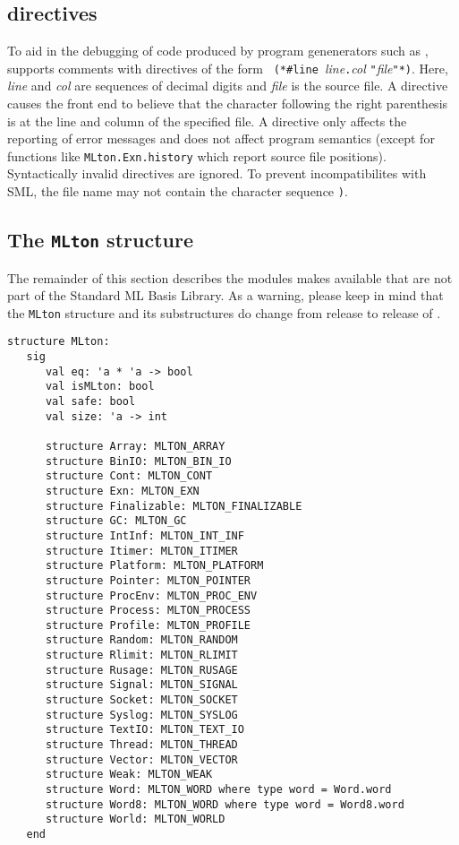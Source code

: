 %
\subsection{{\nline} directives}

To aid in the debugging of code produced by program genenerators such as
,
{\mlton} supports comments with {\nline} directives of the form {\tt
(*\#line }{\it line}{\tt.}{\it col} {\tt "}{\it file}{\tt"*)}.  Here,
{\it line} and {\it col} are sequences of decimal digits and {\it
file} is the source file.  A {\nline} directive causes the front end
to believe that the character following the right parenthesis is at
the line and column of the specified file.  A {\nline} directive only
affects the reporting of error messages and does not affect program
semantics (except for functions like {\tt MLton.Exn.history} which
report source file positions).  Syntactically invalid {\nline}
directives are ignored.  To prevent incompatibilites with SML, the
file name may not contain the character sequence {\tt *)}.
%
\subsection{The {\tt MLton} structure}

The remainder of this section describes the modules {\mlton} makes
available that are not part of the Standard ML Basis Library.  As a
warning, please keep in mind that the {\tt MLton} structure and its
substructures do change from release to release of {\mlton}.

\begin{verbatim}
structure MLton:
   sig
      val eq: 'a * 'a -> bool
      val isMLton: bool
      val safe: bool
      val size: 'a -> int

      structure Array: MLTON_ARRAY
      structure BinIO: MLTON_BIN_IO
      structure Cont: MLTON_CONT
      structure Exn: MLTON_EXN
      structure Finalizable: MLTON_FINALIZABLE
      structure GC: MLTON_GC
      structure IntInf: MLTON_INT_INF
      structure Itimer: MLTON_ITIMER
      structure Platform: MLTON_PLATFORM
      structure Pointer: MLTON_POINTER
      structure ProcEnv: MLTON_PROC_ENV
      structure Process: MLTON_PROCESS
      structure Profile: MLTON_PROFILE
      structure Random: MLTON_RANDOM
      structure Rlimit: MLTON_RLIMIT
      structure Rusage: MLTON_RUSAGE
      structure Signal: MLTON_SIGNAL
      structure Socket: MLTON_SOCKET
      structure Syslog: MLTON_SYSLOG
      structure TextIO: MLTON_TEXT_IO
      structure Thread: MLTON_THREAD
      structure Vector: MLTON_VECTOR
      structure Weak: MLTON_WEAK
      structure Word: MLTON_WORD where type word = Word.word
      structure Word8: MLTON_WORD where type word = Word8.word
      structure World: MLTON_WORLD
   end
\end{verbatim}
%
